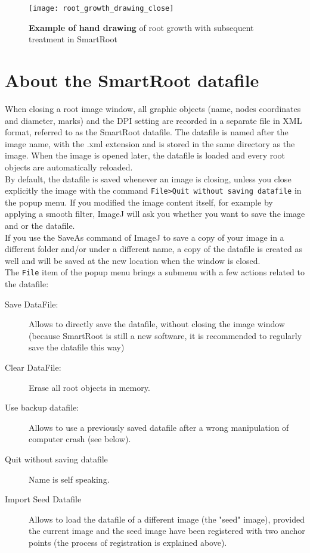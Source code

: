 \documentclass[a4paper,english,10pt]{report}
\begin{document}
\begin{figure}[htbp]
\begin{center}
\texttt{[image: root\_growth\_drawing\_close]}
\caption[Root growth drawing and treatment]{\textbf{Example of hand drawing} of root growth with subsequent treatment in SmartRoot}
\label{root_growth_drawing_close}
\end{center}
\end{figure}


{\color{coolSection}\section{About the SmartRoot datafile}}

When closing a root image window, all graphic objects (name, nodes coordinates and diameter, marks) and the DPI setting are recorded in a separate file in XML format, referred to as the SmartRoot datafile. The datafile is named after the image name, with the .xml extension and is stored in the same directory as the image. When the image is opened later, the datafile is loaded and every root objects are automatically reloaded.\\

By default, the datafile is saved whenever an image is closing, unless you close explicitly the image with the command \verb|File>Quit without saving datafile| in the popup menu. If you modified the image content itself, for example by applying a smooth filter, ImageJ will ask you whether you want to save the image and or the datafile.\\

If you use the SaveAs command of ImageJ to save a copy of your image in a different folder and/or under a different name, a copy of the datafile is created as well and will be saved at the new location when the window is closed.\\
 
The \verb|File| item of the popup menu brings a submenu with a few actions related to the datafile:\\

\begin{description}
\item[Save DataFile:] Allows to directly save the datafile, without closing the image window (because SmartRoot is still a new software, it is recommended to regularly save the datafile this way)
\item[Clear DataFile:] Erase all root objects in memory.
\item[Use backup datafile:] Allows to use a previously saved datafile after a wrong manipulation of computer crash (see below).
\item[Quit without saving datafile] Name is self speaking.
\item[Import Seed Datafile] Allows to load the datafile of a different image (the "seed" image), provided the current image and the seed image have been registered with two anchor points (the process of registration is explained above). 
\end{description}
\end{document}
